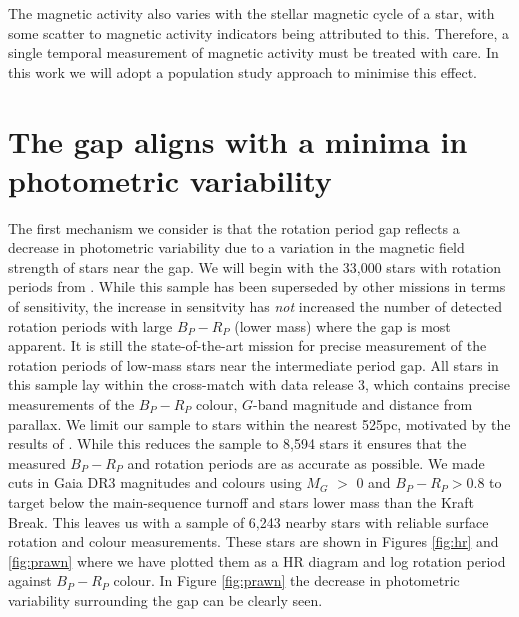 The magnetic activity also varies with the stellar magnetic cycle of a star, with some scatter to magnetic activity indicators being attributed to this.
Therefore, a single temporal measurement of magnetic activity must be treated with care.
In this work we will adopt a population study approach to minimise this effect.

\section{The gap aligns with a minima in photometric variability}
\label{sec:minima_rper}

The first mechanism we consider is that the rotation period gap reflects a decrease in photometric variability due to a variation in the magnetic field strength of stars near the gap.
We will begin with the 33,000 stars with rotation periods from \citet{mcquillan_rotation_2014}.
While this sample has been superseded by other missions in terms of sensitivity, the increase in sensitvity has \textit{not} increased the number of detected rotation periods with large $B_P - R_P$ (lower mass) where the gap is most apparent.
It is still the state-of-the-art mission for precise measurement of the rotation periods of low-mass stars near the intermediate period gap.
All stars in this sample lay within the cross-match with \gaia data release 3, which contains precise measurements of the $B_P - R_P$ colour, $G$-band magnitude and distance from parallax.
We limit our sample to stars within the nearest 525pc, motivated by the results of \citet{davenport_rotating_2018}.
While this reduces the sample to 8,594 stars it ensures that the measured $B_P - R_P$ and rotation periods are as accurate as possible.
We made cuts in Gaia DR3 magnitudes and colours using $M_G$ $>$ 0 and $B_P - R_P > 0.8$ to target below the main-sequence turnoff and stars lower mass than the Kraft Break.
This leaves us with a sample of 6,243 nearby stars with reliable surface rotation and colour measurements.
These stars are shown in Figures \ref{fig:hr} and \ref{fig:prawn} where we have plotted them as a HR diagram and log rotation period against $B_P-R_P$ colour.
In Figure \ref{fig:prawn} the decrease in photometric variability surrounding the gap can be clearly seen.

